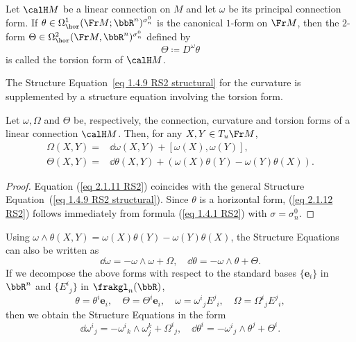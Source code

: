 \begin{defn}
    Let $\calH M$ be a linear connection on $M$ and let $\omega$ be its principal connection form. If $\theta\in\Omega^1_{\hor}(\Fr M;\bbR^n)^{\sigma_n^0}$ is the canonical $1$-form on $\Fr M$, then the $2$-form $\Theta\in\Omega^2_{\hor}(\Fr M,\bbR^n)^{\sigma_n^0}$ defined by
    \[\Theta\coloneqq D^\omega\theta\label{eq 2.1.10 RS2}\]
    is called the torsion form of $\calH M$.
\end{defn}

The Structure Equation~\ref{eq 1.4.9 RS2 structural} for the curvature is supplemented by a structure equation involving the torsion form.

\begin{prop}\label{prop 2.1.11 RS2}
    Let $\omega,\Omega$ and $\Theta$ be, respectively, the connection, curvature and torsion forms of a linear connection $\calH M$. Then, for any $X,Y\in T_u \Fr M$,
    \begin{align}
        \Omega(X,Y)=& \dd\omega(X,Y)+[\omega(X),\omega(Y)],\label{eq 2.1.11 RS2}\\
        \Theta(X,Y)=& \dd\theta(X,Y)+(\omega(X)\theta(Y)-\omega(Y)\theta(X)).\label{eq 2.1.12 RS2}
    \end{align}
\end{prop}
\begin{proof}
    Equation (\ref{eq 2.1.11 RS2}) coincides with the general Structure Equation~(\ref{eq 1.4.9 RS2 structural}). Since $\theta$ is a horizontal form, (\ref{eq 2.1.12 RS2}) follows immediately from formula (\ref{eq 1.4.1 RS2}) with $\sigma=\sigma_n^0$.
\end{proof}

\begin{rem}
    Using $\omega\wedge\theta(X,Y)=\omega(X)\theta(Y)-\omega(Y)\theta(X)$, the Structure Equations can also be written as
    \[\dd\omega=-\omega\wedge\omega+\Omega,\quad \dd\theta=-\omega\wedge\theta+\Theta.\]
    If we decompose the above forms with respect to the standard bases $\{\bm{e}_i\}$ in $\bbR^n$ and $\{E^i{}_j\}$ in $\frakgl_n(\bbR)$,
    \[\theta=\theta^i\bm{e}_i,\quad \Theta=\Theta^i\bm{e}_i,\quad \omega=\omega^i{}_j E^j{}_i,\quad \Omega=\Omega^i{}_j E^j{}_i,\label{eq 2.1.14 RS2}\]
    then we obtain the Structure Equations in the form
    \[\dd\omega^i{}_j=-\omega^i{}_k\wedge \omega^k_j+\Omega^i{}_j,\quad \dd\theta^i=-\omega^i{}_j\wedge \theta^j+\Theta^i.\label{eq 2.1.15 RS2}\]
\end{rem}

